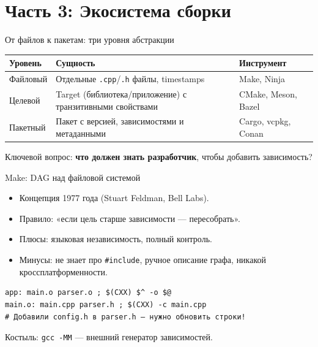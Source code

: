 \documentclass{beamer}
\begin{document}
\section{Часть 3: Экосистема сборки}

\begin{frame}{От файлов к пакетам: три уровня абстракции}
\begin{center}
\small
\begin{tabular}{p{2cm}p{3.5cm}p{3.5cm}}
\toprule
\textbf{Уровень} & \textbf{Сущность} & \textbf{Инструмент} \\
\midrule
Файловый & Отдельные \texttt{.cpp}/\texttt{.h} файлы, timestamps & Make, Ninja \\
\midrule
Целевой & Target (библиотека/приложение) с транзитивными
свойствами & CMake, Meson, Bazel \\
\midrule
Пакетный & Пакет с версией, зависимостями и метаданными & Cargo, vcpkg, Conan \\
\bottomrule
\end{tabular}
\end{center}
\vspace{0.5em}
Ключевой вопрос: \textbf{что должен знать разработчик}, чтобы добавить зависимость?
\end{frame}

\begin{frame}[fragile]{Make: DAG над файловой системой}
\begin{itemize}
\item Концепция 1977 года (Stuart Feldman, Bell Labs).
\item Правило: «если цель старше зависимости — пересобрать».
\item Плюсы: языковая независимость, полный контроль.
\item Минусы: не знает про \texttt{\#include}, ручное описание графа,
никакой кроссплатформенности.
\end{itemize}
\begin{lstlisting}[language=Make,numbers=none]
app: main.o parser.o ; $(CXX) $^ -o $@
main.o: main.cpp parser.h ; $(CXX) -c main.cpp
# Добавили config.h в parser.h — нужно обновить строки!
\end{lstlisting}
Костыль: \texttt{gcc -MM} — внешний генератор зависимостей.
\end{frame}
\end{document}
